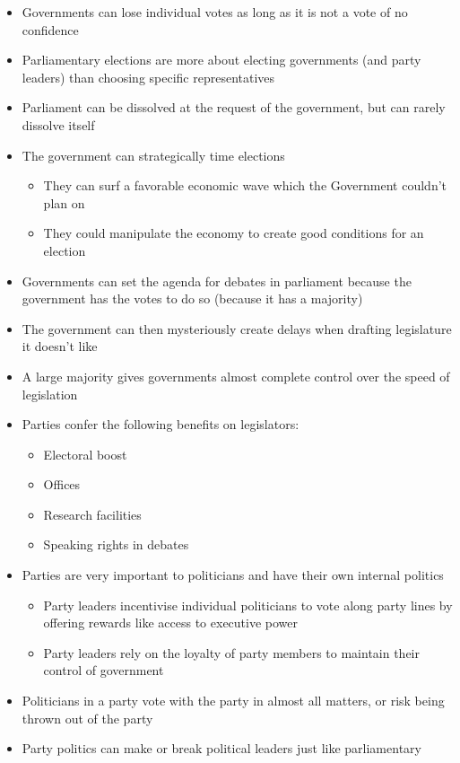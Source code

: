 \documentclass[11pt]{article}
\begin{document}
\begin{itemize}
\item Governments can lose individual votes as long as it is not a vote of no confidence
\item Parliamentary elections are more about electing governments (and party
leaders) than choosing specific representatives
\item Parliament can be dissolved at the request of the government, but can rarely
dissolve itself
\item The government can strategically time elections
\begin{itemize}
\item They can surf a favorable economic wave which the Government couldn't plan on
\item They could manipulate the economy to create good conditions for an election
\end{itemize}
\item Governments can set the agenda for debates in parliament because the
government has the votes to do so (because it has a majority)
\item The government can then mysteriously create delays when drafting legislature
it doesn't like
\item A large majority gives governments almost complete control over the speed of legislation
\item Parties confer the following benefits on legislators:
\begin{itemize}
\item Electoral boost
\item Offices
\item Research facilities
\item Speaking rights in debates
\end{itemize}
\item Parties are very important to politicians and have their own internal politics
\begin{itemize}
\item Party leaders incentivise individual politicians to vote along party lines
by offering rewards like access to executive power
\item Party leaders rely on the loyalty of party members to maintain their control
of government
\end{itemize}
\item Politicians in a party vote with the party in almost all matters, or risk
being thrown out of the party
\item Party politics can make or break political leaders just like parliamentary

\end{itemize}
\end{document}
